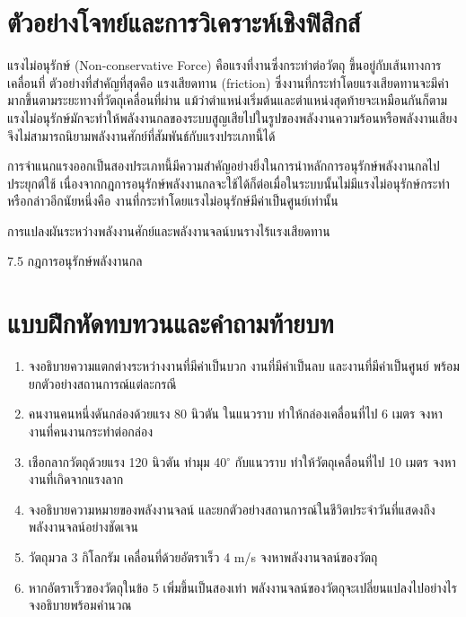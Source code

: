 \section{ตัวอย่างโจทย์และการวิเคราะห์เชิงฟิสิกส์}

\begin{examplebox}
แรงไม่อนุรักษ์ (Non-conservative Force) คือแรงที่งานซึ่งกระทำต่อวัตถุ ขึ้นอยู่กับเส้นทางการเคลื่อนที่ ตัวอย่างที่สำคัญที่สุดคือ แรงเสียดทาน (friction) ซึ่งงานที่กระทำโดยแรงเสียดทานจะมีค่ามากขึ้นตามระยะทางที่วัตถุเคลื่อนที่ผ่าน แม้ว่าตำแหน่งเริ่มต้นและตำแหน่งสุดท้ายจะเหมือนกันก็ตาม แรงไม่อนุรักษ์มักจะทำให้พลังงานกลของระบบสูญเสียไปในรูปของพลังงานความร้อนหรือพลังงานเสียง จึงไม่สามารถนิยามพลังงานศักย์ที่สัมพันธ์กับแรงประเภทนี้ได้

การจำแนกแรงออกเป็นสองประเภทนี้มีความสำคัญอย่างยิ่งในการนำหลักการอนุรักษ์พลังงานกลไปประยุกต์ใช้ เนื่องจากกฎการอนุรักษ์พลังงานกลจะใช้ได้ก็ต่อเมื่อในระบบนั้นไม่มีแรงไม่อนุรักษ์กระทำ หรือกล่าวอีกนัยหนึ่งคือ งานที่กระทำโดยแรงไม่อนุรักษ์มีค่าเป็นศูนย์เท่านั้น

การแปลงผันระหว่างพลังงานศักย์และพลังงานจลน์บนรางไร้แรงเสียดทาน

7.5 กฎการอนุรักษ์พลังงานกล
\end{examplebox}

\section{แบบฝึกหัดทบทวนและคำถามท้ายบท}

\begin{enumerate}
    \item จงอธิบายความแตกต่างระหว่างงานที่มีค่าเป็นบวก งานที่มีค่าเป็นลบ และงานที่มีค่าเป็นศูนย์ พร้อมยกตัวอย่างสถานการณ์แต่ละกรณี
    \item คนงานคนหนึ่งดันกล่องด้วยแรง 80 นิวตัน ในแนวราบ ทำให้กล่องเคลื่อนที่ไป 6 เมตร จงหางานที่คนงานกระทำต่อกล่อง
    \item เชือกลากวัตถุด้วยแรง 120 นิวตัน ทำมุม 40$^\circ$ กับแนวราบ ทำให้วัตถุเคลื่อนที่ไป 10 เมตร จงหางานที่เกิดจากแรงลาก
    \item จงอธิบายความหมายของพลังงานจลน์ และยกตัวอย่างสถานการณ์ในชีวิตประจำวันที่แสดงถึงพลังงานจลน์อย่างชัดเจน
    \item วัตถุมวล 3 กิโลกรัม เคลื่อนที่ด้วยอัตราเร็ว 4 m/s จงหาพลังงานจลน์ของวัตถุ
    \item หากอัตราเร็วของวัตถุในข้อ 5 เพิ่มขึ้นเป็นสองเท่า พลังงานจลน์ของวัตถุจะเปลี่ยนแปลงไปอย่างไร จงอธิบายพร้อมคำนวณ
\end{enumerate}

